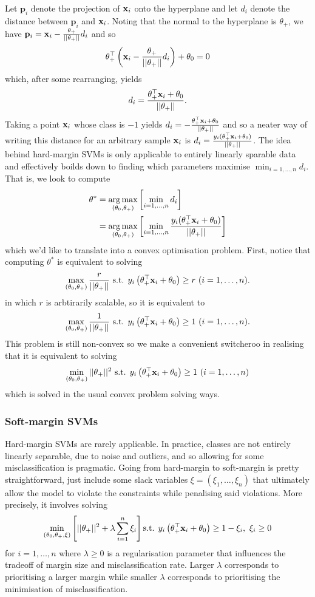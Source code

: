 \documentclass[11pt]{article}
\begin{document}
\noindent Let $\mathbf{p}_i$ denote the projection of $\mathbf{x}_i$ onto the hyperplane and let $d_i$ denote the distance between $\mathbf{p}_i$ and $\mathbf{x}_i$. Noting that the normal to the hyperplane is $\theta_+$, we have $\mathbf{p}_i=\mathbf{x}_i-\frac{\theta_+}{||\theta_+||}d_i$ and so
$$
\theta_+^\top \left(\mathbf{x}_i-\frac{\theta_+}{||\theta_+||}d_i\right)+\theta_0
=
0
$$
which, after some rearranging, yields
$$
d_i
=
\frac{\theta_+^\top \mathbf{x}_i+\theta_0}{||\theta_+||}.
$$
Taking a point $\mathbf{x}_i$ whose class is $-1$ yields $d_i=-\frac{\theta_+^\top \mathbf{x}_i+\theta_0}{||\theta_+||}$ and so a neater way of writing this distance for an arbitrary sample $\mathbf{x}_i$ is $d_i=\frac{y_i(\theta_+^\top \mathbf{x}_i+\theta_0)}{||\theta_+||}$. The idea behind hard-margin SVMs is only applicable to entirely linearly sparable data and effectively boilds down to finding which parameters maximise $\min_{i=1,\dots,n}d_i$. That is, we look to compute
\begin{align*}
    \theta^{*}
    &=
    \operatorname*{arg\,max}_{(\theta_0,\theta_+)}\left[\min_{i=1,\dots,n}d_i\right]\\
    &=
    \operatorname*{arg\,max}_{(\theta_0,\theta_+)}\left[\min_{i=1,\dots,n}\frac{y_i(\theta_+^\top \mathbf{x}_i+\theta_0)}{||\theta_+||}\right]\\
\end{align*}
which we'd like to translate into a convex optimisation problem. First, notice that computing $\theta^{*}$ is equivalent to solving
$$
\max_{(\theta_0,\theta_+)}\frac{r}{||\theta_+||}\text{ s.t. } y_i\left(\theta_+^\top \mathbf{x}_i+\theta_0\right)\geq r\text{ } (i=1,\dots,n).
$$
in which $r$ is arbtirarily scalable, so it is equivalent to
$$
\max_{(\theta_0,\theta_+)}\frac{1}{||\theta_+||}\text{ s.t. } y_i\left(\theta_+^\top \mathbf{x}_i+\theta_0\right)\geq 1\text{ } (i=1,\dots,n).
$$
This problem is still non-convex so we make a convenient switcheroo in realising that it is equivalent to solving
$$
\min_{(\theta_0,\theta_+)}||\theta_+||^2\text{ s.t. } y_i\left(\theta_+^\top \mathbf{x}_i+\theta_0\right)\geq 1\text{ } (i=1,\dots,n)
$$
which is solved in the usual convex problem solving ways.

\subsubsection{Soft-margin SVMs}

Hard-margin SVMs are rarely applicable. In practice, classes are not entirely linearly separable, due to noise and outliers, and so allowing for some misclassification is pragmatic. Going from hard-margin to soft-margin is pretty straightforward, just include some slack variables $\xi=(\xi_1,\dots,\xi_n)$ that ultimately allow the model to violate the constraints while penalising said violations. More precisely, it involves solving
$$
\min_{(\theta_0,\theta_+,\xi)}\left[||\theta_+||^2+\lambda\sum_{i=1}^n\xi_i\right]\text{s.t. } y_i\left(\theta_+^\top \mathbf{x}_i+\theta_0\right)\geq 1-\xi_i,\text{ }\xi_i\geq0
$$
for $i=1,\dots,n$ where $\lambda\geq0$ is a regularisation parameter that influences the tradeoff of margin size and misclassification rate. Larger $\lambda$ corresponds to prioritising a larger margin while smaller $\lambda$ corresponds to prioritising the minimisation of misclassification.
\end{document}

